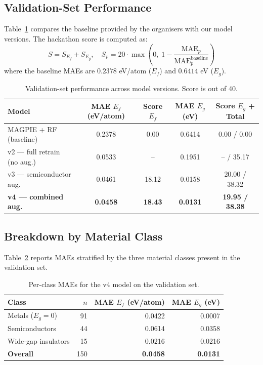 \documentclass[10pt, a4paper]{article}
\begin{document}
\subsection{Validation-Set Performance}

Table~\ref{tab:results} compares the baseline provided by the organisers
with our model versions.
The hackathon score is computed as:
\[
  S = S_{E_f} + S_{E_g},
  \quad
  S_p = 20 \cdot \max\!\left(0,\;
    1 - \frac{\text{MAE}_p}{\text{MAE}_p^{\text{baseline}}}
  \right)
\]
where the baseline MAEs are $0.2378$ eV/atom ($E_f$) and
$0.6414$ eV ($E_g$).

\begin{table}[h!]
\centering
\caption{Validation-set performance across model versions.
  Score is out of 40.}
\label{tab:results}
\begin{tabular}{@{}lcccc@{}}
\toprule
Model & MAE $E_f$ (eV/atom) & Score $E_f$ & MAE $E_g$ (eV) &
  Score $E_g$ + Total \\
\midrule
MAGPIE + RF (baseline)        & 0.2378 & 0.00 & 0.6414 & 0.00 / 0.00 \\
v2 — full retrain (no aug.)   & 0.0533 & -- & 0.1951 & -- / 35.17 \\
v3 — semiconductor aug.       & 0.0461 & 18.12 & 0.0158 & 20.00 / 38.32 \\
\textbf{v4 — combined aug.}   & \textbf{0.0458} & \textbf{18.43} &
  \textbf{0.0131} & \textbf{19.95 / 38.38} \\
\bottomrule
\end{tabular}
\end{table}

\subsection{Breakdown by Material Class}

Table~\ref{tab:class} reports MAEs stratified by the three material
classes present in the validation set.

\begin{table}[h!]
\centering
\caption{Per-class MAEs for the v4 model on the validation set.}
\label{tab:class}
\begin{tabular}{@{}lrrr@{}}
\toprule
Class & $n$ & MAE $E_f$ (eV/atom) & MAE $E_g$ (eV) \\
\midrule
Metals ($E_g = 0$)        & 91 & 0.0422 & 0.0007 \\
Semiconductors            & 44 & 0.0614 & 0.0358 \\
Wide-gap insulators       & 15 & 0.0216 & 0.0216 \\
\midrule
\textbf{Overall}          & 150 & \textbf{0.0458} & \textbf{0.0131} \\
\bottomrule
\end{tabular}
\end{table}
\end{document}
